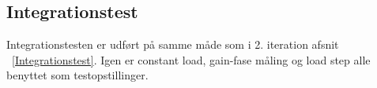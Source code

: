 \subsection{Integrationstest}
Integrationstesten er udført på samme måde som i 2. iteration afsnit ~\ref{Integrationstest}. Igen er constant load, gain-fase måling og load step alle benyttet som testopstillinger. 